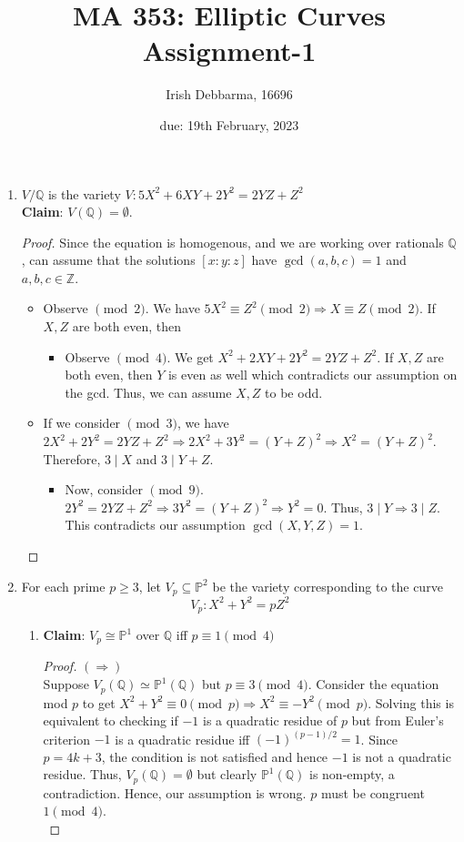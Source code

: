\documentclass[oneside, 12pt, ]{article}
\title{MA 353: Elliptic Curves \\ Assignment-1}
\author{Irish Debbarma, 16696}
\date{due: 19th February, 2023}
\newcommand{\QQ}{\mathbb Q}
\newcommand{\ZZ}{\mathbb Z}
\newcommand{\PP}{\mathbb P}
\begin{document}
\maketitle

\begin{enumerate}
\item $V/\QQ$ is the variety $V: 5X^2 + 6XY + 2Y^2 = 2YZ + Z^2$ \\

\textbf{Claim}: $V(\QQ) = \emptyset$. 
\begin{proof}
Since the equation is homogenous, and we are working over rationals $\QQ$, can assume that the solutions $[x:y:z]$ have $\gcd(a,b,c)=1$ and $a,b,c\in \ZZ$. 
\begin{itemize}
\item Observe $\pmod{2}$. We have $5X^2 \equiv Z^2 \pmod{2} \Rightarrow X \equiv Z \pmod{2}$. If $X,Z$ are both even, then 
\begin{itemize}
\item Observe $\pmod{4}$. We get $X^2 + 2XY + 2Y^2  = 2YZ + Z^2$. If $X,Z$ are both even, then $Y$ is even as well which contradicts our assumption on the gcd. Thus, we can assume $X,Z$ to be odd.  
\end{itemize}
\item  If we consider $\pmod{3}$, we have $2X^2 + 2Y^2 = 2YZ + Z^2 \Rightarrow 2X^2 + 3Y^2 = (Y+Z)^2 \Rightarrow X^2 = (Y+Z)^2$. Therefore, $3 \mid X$ and $3 \mid Y+Z$.
\begin{itemize}
\item Now, consider $\pmod{9}$. $2Y^2 = 2YZ + Z^2 \Rightarrow 3Y^2 = (Y+Z)^2 \Rightarrow Y^2 = 0$. Thus, $3 \mid Y \Rightarrow 3 \mid Z$. This contradicts our assumption $\gcd(X,Y,Z)=1$. 
\end{itemize}
\end{itemize} 
\end{proof}

\item For each prime $p\geq 3$, let $V_{p} \subseteq \PP^2$ be the variety corresponding to the curve $$V_{p}: X^2 + Y^2 = pZ^2$$

\begin{enumerate}
\item \textbf{Claim}: $V_{p} \cong \PP^1 $ over $\QQ$ iff $p \equiv 1 \pmod{4}$
\begin{proof}
$(\Rightarrow)$ \\

Suppose $V_{p}(\QQ) \simeq \PP^1(\QQ)$ but $p \equiv 3 \pmod{4}$. Consider the equation mod $p$ to get $X^2 + Y^2 \equiv 0 \pmod{p} \Rightarrow X^2 \equiv -Y^2 \pmod{p}$. Solving this is equivalent to checking if $-1$ is a quadratic residue of $p$ but from Euler's criterion $-1$ is a quadratic residue iff $(-1)^{(p-1)/2} =1$. Since $p = 4k+3$, the condition is not satisfied and hence $-1$ is not a quadratic residue. Thus, $V_{p}(\QQ) = \emptyset$ but clearly $\PP^1(\QQ)$ is non-empty, a contradiction. Hence, our assumption is wrong. $p$ must be congruent $1 \pmod{4}$. \\


\end{proof}
\end{enumerate}
\end{enumerate}
\end{document}
